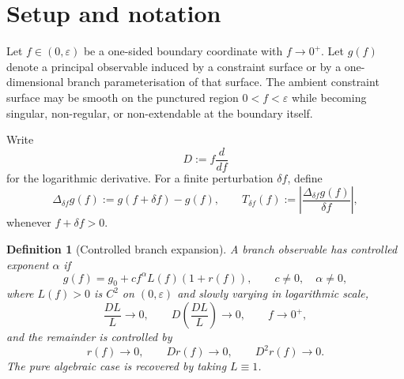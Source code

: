 \documentclass[11pt,a4paper]{article}
\newtheorem{definition}[theorem]{Definition}
\begin{document}
\begin{abstract}
A six-candidate refinery audit of algebraically-equivalent rewrites of the same constraint identity in the pure-algebraic fixture finds that the Sterbenz-blessed form is not the minimum-burden representation under the V4 evaluation-policy burden vector. A reassociated form that trades operation-level exact subtraction for sub-lattice alignment dominates on lattice burden while tying on arithmetic conditioning amplitude. This is a V4-native discovery of \emph{sub-lattice alignment} as a separate optimization criterion from operation-level exactness; it does not refute Sterbenz's exactness claim, which concerns one operation while the audit measures the total chain residual structure on the algebraic identity. A diagnostic-versus-evaluation policy tension surfaces as a substantive substrate observation rather than a philosophical concern.
\end{abstract}

\section{Setup and notation}

Let $f\in(0,\varepsilon)$ be a one-sided boundary coordinate with $f\to0^+$. Let $g(f)$ denote a principal observable induced by a constraint surface or by a one-dimensional branch parameterisation of that surface. The ambient constraint surface may be smooth on the punctured region $0<f<\varepsilon$ while becoming singular, non-regular, or non-extendable at the boundary itself.

Write
\[
    D := f\frac{d}{df}
\]
for the logarithmic derivative. For a finite perturbation $\delta f$, define
\[
    \Delta_{\delta f}g(f):=g(f+\delta f)-g(f),
    \qquad
    T_{\delta f}(f):=\left|\frac{\Delta_{\delta f}g(f)}{\delta f}\right|,
\]
whenever $f+\delta f>0$.

\begin{definition}[Controlled branch expansion]
A branch observable has controlled exponent $\alpha$ if
\begin{equation}\label{eq:controlled-branch}
    g(f)=g_0+c f^{\alpha}L(f)(1+r(f)),
    \qquad c\ne0,\quad \alpha\ne0,
\end{equation}
where $L(f)>0$ is $C^2$ on $(0,\varepsilon)$ and slowly varying in logarithmic scale,
\begin{equation}\label{eq:slowly-varying}
    \frac{DL}{L}\to0,
    \qquad
    D\!\left(\frac{DL}{L}\right)\to0,
    \qquad f\to0^+,
\end{equation}
and the remainder is controlled by
\begin{equation}\label{eq:controlled-r}
    r(f)\to0,
    \qquad Dr(f)\to0,
    \qquad D^2r(f)\to0.
\end{equation}
The pure algebraic case is recovered by taking $L\equiv1$.
\end{definition}
\end{document}
